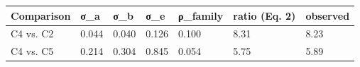 \begin{tabular}{lllllll}
\toprule
Comparison & σ_a & σ_b & σ_e & ρ_family & ratio (Eq. 2) & observed \\
\midrule
C4 vs. C2 & 0.044 & 0.040 & 0.126 & 0.100 & 8.31 & 8.23 \\
C4 vs. C5 & 0.214 & 0.304 & 0.845 & 0.054 & 5.75 & 5.89 \\
\bottomrule
\end{tabular}
